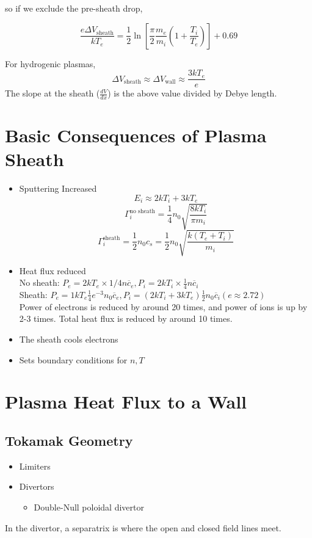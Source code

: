 \documentclass[12pt]{article}
\begin{document}
so if we exclude the pre-sheath drop,

$$\frac{e\Delta V_{\text{sheath}}}{kT_e} = \frac{1}{2} \ln \left[\frac{\pi}{2}\frac{m_e}{m_i}\left(1+\frac{T_i}{T_e}\right)\right] + 0.69$$

For hydrogenic plasmas,
$$\Delta V_{\text{sheath}} \approx \Delta V_{\text{wall}} \approx \frac{3kT_e}{e}$$
The slope at the sheath ($\frac{dV}{dx}$) is the above value divided by Debye length.

\section{Basic Consequences of Plasma Sheath}

\begin{itemize}
    \item Sputtering Increased
        $$E_i \approx 2kT_i + 3kT_e$$
        $$\Gamma_i^{\text{no sheath}} = \frac{1}{4} n_0\sqrt{\frac{8kT_i}{\pi m_i}}$$
        $$\Gamma_i^{\text{sheath}} = \frac{1}{2} n_0 c_s = \frac{1}{2} n_0 \sqrt{\frac{k(T_e+T_i)}{m_i}}$$
    \item Heat flux reduced \\
        No sheath: $P_e = 2kT_e \times 1/4 n\overline c_e, P_i = 2kT_i \times \frac{1}{4} n\overline c_i$ \\
        Sheath: $P_e = 1kT_e \frac{1}{4} e^{-3} n_0\overline c_e, P_i = (2kT_i + 3kT_e) \frac{1}{2}n_0\overline c_i (e \approx 2.72)$ \\
        Power of electrons is reduced by around 20 times, and power of ions is up by 2-3 times. Total heat flux is reduced by around 10 times.
    \item The sheath cools electrons
    \item Sets boundary conditions for $n,T$
\end{itemize}
    
\section{Plasma Heat Flux to a Wall}

\subsection{Tokamak Geometry}

\begin{itemize}
    \item Limiters
    \item Divertors
        \begin{itemize}
            \item Double-Null poloidal divertor
        \end{itemize}
\end{itemize}
 In the divertor, a separatrix is where the open and closed field lines meet.
\end{document}
